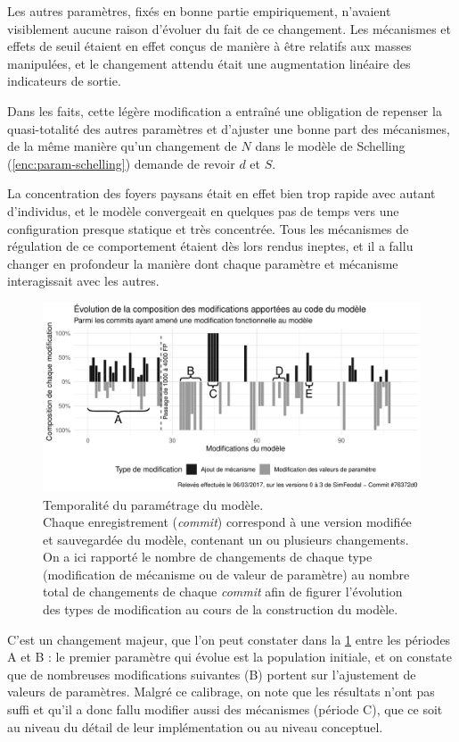 Les autres paramètres, fixés en bonne partie empiriquement, n'avaient visiblement aucune raison d'évoluer du fait de ce changement.
Les mécanismes  et effets de seuil étaient en effet conçus de manière à être relatifs aux masses manipulées, et le changement attendu était une augmentation linéaire des indicateurs de sortie.


Dans les faits, cette légère modification a entraîné une obligation de repenser la quasi-totalité des autres paramètres et d'ajuster une bonne part des mécanismes, de la même manière qu'un changement de $N$ dans le modèle de Schelling (\cref{enc:param-schelling}) demande de revoir $d$ et $S$.

La concentration des foyers paysans était en effet bien trop rapide avec autant d'individus, et le modèle convergeait en quelques pas de temps vers une configuration presque statique et très concentrée.
Tous les mécanismes de régulation de ce comportement étaient dès lors rendus ineptes, et il a fallu changer en profondeur la manière dont chaque paramètre et mécanisme interagissait avec les autres.

\begin{figure}[H]
	\includegraphics[width = \linewidth]{img/plotComits_clean.pdf}
	\caption[Temporalité du paramétrage du modèle.]{Temporalité du paramétrage du modèle.\\
	{\small
	Chaque \og enregistrement\fg{} (\textit{commit}) correspond à une version modifiée et sauvegardée du modèle, contenant un ou plusieurs changements.
	On a ici rapporté le nombre de changements de chaque type (modification de mécanisme ou de valeur de paramètre) au nombre total de changements de chaque \textit{commit} afin de figurer l'évolution des types de modification au cours de la construction du modèle.}
	}
	\label{fig:comits-periodes}
\end{figure}

C'est un changement majeur, que l'on peut constater dans la \cref{fig:comits-periodes} entre les périodes \og A\fg{} et \og B\fg{} :
le premier paramètre qui évolue est la population initiale, et on constate que de nombreuses modifications suivantes (B) portent sur l'ajustement de valeurs de paramètres.
Malgré ce calibrage, on note que les résultats n'ont pas suffi et qu'il a donc fallu modifier aussi des mécanismes (période C), que ce soit au niveau du détail de leur implémentation ou au niveau conceptuel.

